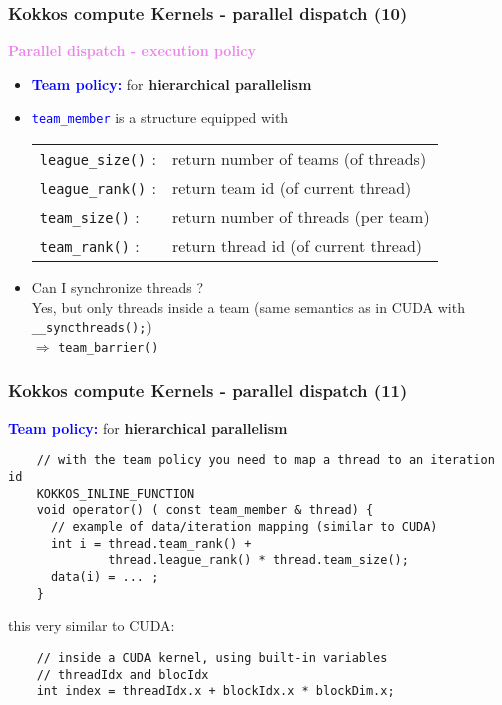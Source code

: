 \begin{frame}[fragile=singleslide]
  \frametitle{Kokkos compute Kernels - parallel dispatch (10)}

  {\Large \textcolor{violet}{\textbf{Parallel dispatch - execution policy}}}

  \begin{itemize}
  \item \textcolor{blue}{\bf Team policy:} for {\bf hierarchical parallelism}
  \item \textcolor{blue}{\texttt{team\_member}} is a structure equipped with
    \begin{tabular}{ll}
      \texttt{league\_size()} : & return number of teams (of threads)\\
      \texttt{league\_rank()} : & return team id (of current thread)\\
      \texttt{team\_size()}   : & return number of threads (per team)\\
      \texttt{team\_rank()} : & return thread id (of current thread)
    \end{tabular}
  \item Can I synchronize threads ?\\
    Yes, but only threads inside a team (same semantics as in CUDA with \texttt{\_\_syncthreads();})\\
    $\Rightarrow$ \texttt{team\_barrier()}
    
  \end{itemize}
  
\end{frame}
  
\begin{frame}[fragile=singleslide]
  \frametitle{Kokkos compute Kernels - parallel dispatch (11)}

  {\large \textcolor{blue}{\bf Team policy:} for {\bf hierarchical parallelism}}

  \begin{verbatim}
    // with the team policy you need to map a thread to an iteration id
    KOKKOS_INLINE_FUNCTION
    void operator() ( const team_member & thread) {
      // example of data/iteration mapping (similar to CUDA)
      int i = thread.team_rank() +
              thread.league_rank() * thread.team_size();
      data(i) = ... ;
    }
  \end{verbatim}
  this very similar to CUDA:
  \begin{verbatim}
    // inside a CUDA kernel, using built-in variables
    // threadIdx and blocIdx
    int index = threadIdx.x + blockIdx.x * blockDim.x;
  \end{verbatim}
  
\end{frame}
  
